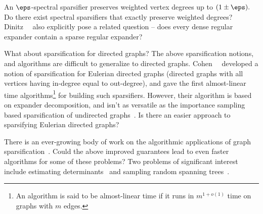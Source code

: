 \begin{tight_enumerate}
\item An $\eps$-spectral sparsifier preserves weighted vertex degrees
  up to $(1\pm\eps).$ Do there exist spectral sparsifiers that exactly
  preserve weighted degrees? Dinitz~\etal~\cite{DinitzKW15} also
  explicitly pose a related question -- does every dense regular
  expander contain a sparse regular expander?
\item What about sparsification for directed graphs? The above
  sparsification notions, and algorithms are difficult to generalize
  to directed graphs. Cohen~\etal~\cite{CohenKPPSV16} developed a
  notion of sparsification for Eulerian directed graphs (directed
  graphs with all vertices having in-degree equal to out-degree), and
  gave the first almost-linear time algorithms\footnote{An algorithm
    is said to be almost-linear time if it runs in $m^{1+o(1)}$ time
    on graphs with $m$ edges.} for building such sparsifiers. However,
  their algorithm is based on expander decomposition, and isn't as
  versatile as the importance sampling based sparsification of
  undirected graphs~\cite{SpielmanS08:journal}. Is there an easier
  approach to sparsifying Eulerian directed graphs?
\item There is an ever-growing body of work on the algorithmic
  applications of graph sparsification~\cite{Spielman10,
    Teng10:survey, BatsonSST13, Teng16:book}. Could the above improved
  guarantees lead to even faster algorithms for some of these
  problems? Two problems of significant interest include estimating
  determinants~\cite{DurfeeKPRS17} and sampling random spanning
  trees~\cite{DurfeeKPRS17, DurfeePPR17, Schild17:arxiv}.
\end{tight_enumerate}







